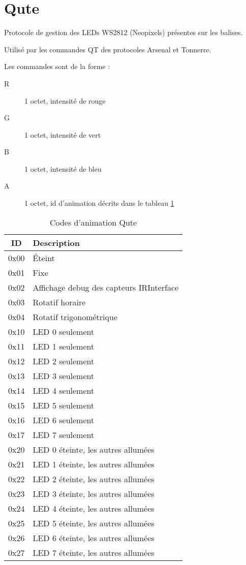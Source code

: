 \section{Qute}
\label{sec:Qute}

Protocole de gestion des LEDs WS2812 (Neopixels) présentes sur les balises.

Utilisé par les commandes QT des protocoles Arsenal et Tonnerre.

Les commandes sont de la forme :

\begin{description}
	\item[R] 1 octet, intensité de rouge
	\item[G] 1 octet, intensité de vert
	\item[B] 1 octet, intensité de bleu
	\item[A] 1 octet, id d'animation décrits dans le tableau \ref{fig:codes-animation-QT}
\end{description}

\begin{table}[htb]
	\centering
	\begin{tabular}{|cl|} \hline
		ID   & Description \\ \hline
		0x00 & Éteint \\
		0x01 & Fixe \\
		0x02 & Affichage debug des capteurs IRInterface \\
		0x03 & Rotatif horaire \\
		0x04 & Rotatif trigonométrique \\
		0x10 & LED 0 seulement \\
		0x11 & LED 1 seulement \\
		0x12 & LED 2 seulement \\
		0x13 & LED 3 seulement \\
		0x14 & LED 4 seulement \\
		0x15 & LED 5 seulement \\
		0x16 & LED 6 seulement \\
		0x17 & LED 7 seulement \\
		0x20 & LED 0 éteinte, les autres allumées \\
		0x21 & LED 1 éteinte, les autres allumées \\
		0x22 & LED 2 éteinte, les autres allumées \\
		0x23 & LED 3 éteinte, les autres allumées \\
		0x24 & LED 4 éteinte, les autres allumées \\
		0x25 & LED 5 éteinte, les autres allumées \\
		0x26 & LED 6 éteinte, les autres allumées \\
		0x27 & LED 7 éteinte, les autres allumées \\
		\hline
	\end{tabular}
	\caption{Codes d'animation Qute}
	\label{fig:codes-animation-QT}
\end{table}
